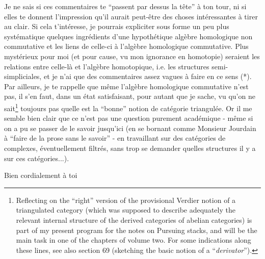 Je ne sais si ces commentaires te ``passent par dessus la tête'' à ton tour, ni si elles te donnent l'impression qu'il aurait peut-être des choses intéressantes à tirer au clair. Si cela t'intéresse, je pourrais expliciter sous forme un peu plus systématique quelques ingrédients d'une hypothétique algèbre homologique non commutative et les liens de celle-ci à l'algèbre homologique commutative. Plus mystérieux pour moi (et pour cause, vu mon ignorance en homotopie) seraient les relations entre celle-là et l'algèbre homotopique, i.e. les structures semi-simpliciales, et je n'ai que des commentaires assez vagues à faire en ce sens (*). Par ailleurs, je te rappelle que même l'algèbre homologique commutative n'est pas, il s'en faut, dans un état satisfaisant, pour autant que je sache, vu qu'on ne sait\footnote{Reflecting on the ``right'' version of the provisional Verdier notion of a triangulated category (which was supposed to describe adequately the relevant internal structure of the derived categories of abelian categories) is part of my present program for the notes on Pursuing stacks, and will be the main task in one of the chapters of volume two. For some indications along these lines, see also section 69 (sketching the basic notion of a ``\emph{derivator}'').} toujours pas quelle est la ``bonne'' notion de catégorie triangulée. Or il me semble bien clair que ce n'est pas une question purement académique - même si on a pu se passer de le savoir jusqu'ici (en se bornant comme Monsieur Jourdain à ``faire de la prose sans le savoir'' - en travaillant sur des catégories de complexes, éventuellement filtrés, sans trop se demander quelles structures il y a sur ces catégories...).

Bien cordialement à toi

